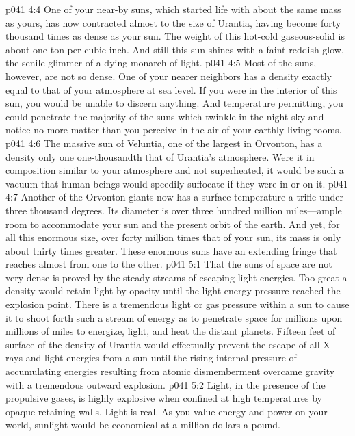 \vs p041 4:4 One of your near\hyp{}by suns, which started life with about the same mass as yours, has now contracted almost to the size of Urantia, having become forty thousand times as dense as your sun. The weight of this hot\hyp{}cold gaseous\hyp{}solid is about one ton per cubic inch. And still this sun shines with a faint reddish glow, the senile glimmer of a dying monarch of light.
\vs p041 4:5 Most of the suns, however, are not so dense. One of your nearer neighbors has a density exactly equal to that of your atmosphere at sea level. If you were in the interior of this sun, you would be unable to discern anything. And temperature permitting, you could penetrate the majority of the suns which twinkle in the night sky and notice no more matter than you perceive in the air of your earthly living rooms.
\vs p041 4:6 The massive sun of Veluntia, one of the largest in Orvonton, has a density only one one\hyp{}thousandth that of Urantia’s atmosphere. Were it in composition similar to your atmosphere and not superheated, it would be such a vacuum that human beings would speedily suffocate if they were in or on it.
\vs p041 4:7 Another of the Orvonton giants now has a surface temperature a trifle under three thousand degrees. Its diameter is over three hundred million miles---ample room to accommodate your sun and the present orbit of the earth. And yet, for all this enormous size, over forty million times that of your sun, its mass is only about thirty times greater. These enormous suns have an extending fringe that reaches almost from one to the other.
\vs p041 5:1 That the suns of space are not very dense is proved by the steady streams of escaping light\hyp{}energies. Too great a density would retain light by opacity until the light\hyp{}energy pressure reached the explosion point. There is a tremendous light or gas pressure within a sun to cause it to shoot forth such a stream of energy as to penetrate space for millions upon millions of miles to energize, light, and heat the distant planets. Fifteen feet of surface of the density of Urantia would effectually prevent the escape of all X rays and light\hyp{}energies from a sun until the rising internal pressure of accumulating energies resulting from atomic dismemberment overcame gravity with a tremendous outward explosion.
\vs p041 5:2 Light, in the presence of the propulsive gases, is highly explosive when confined at high temperatures by opaque retaining walls. Light is real. As you value energy and power on your world, sunlight would be economical at a million dollars a pound.
